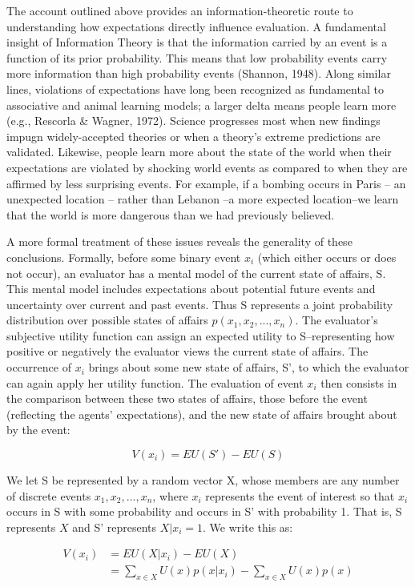\documentclass[]{article}
\begin{document}
The account outlined above provides an information-theoretic route to
understanding how expectations directly influence evaluation. A
fundamental insight of Information Theory is that the information
carried by an event is a function of its prior probability. This means
that low probability events carry more information than high probability
events (Shannon, 1948). Along similar lines, violations of expectations
have long been recognized as fundamental to associative and animal
learning models; a larger delta means people learn more (e.g., Rescorla
\& Wagner, 1972). Science progresses most when new findings impugn
widely-accepted theories or when a theory's extreme predictions are
validated. Likewise, people learn more about the state of the world when
their expectations are violated by shocking world events as compared to
when they are affirmed by less surprising events. For example, if a
bombing occurs in Paris -- an unexpected location -- rather than Lebanon
--a more expected location--we learn that the world is more dangerous
than we had previously believed.

A more formal treatment of these issues reveals the generality of these
conclusions. Formally, before some binary event \(x_i\) (which either
occurs or does not occur), an evaluator has a mental model of the
current state of affairs, S. This mental model includes expectations
about potential future events and uncertainty over current and past
events. Thus S represents a joint probability distribution over possible
states of affairs \(p(x_1, x_2, ..., x_n)\). The evaluator's subjective
utility function can assign an expected utility to S--representing how
positive or negatively the evaluator views the current state of affairs.
The occurrence of \(x_i\) brings about some new state of affairs, S', to
which the evaluator can again apply her utility function. The evaluation
of event \(x_i\) then consists in the comparison between these two
states of affairs, those before the event (reflecting the agents'
expectations), and the new state of affairs brought about by the event:

\[ V(x_i) = EU(S') -EU(S) \]

We let S be represented by a random vector X, whose members are any
number of discrete events \(x_1, x_2, ..., x_n\), where \(x_i\)
represents the event of interest so that \(x_i\) occurs in S with some
probability and occurs in S' with probability 1. That is, S represents
\(X\) and S' represents \(X|x_i=1\). We write this as:

\[
\begin{aligned}
V(x_i) &= EU(X|x_i) - EU(X) \\
&= \sum_{x \in X} U(x)p(x|x_i) - \sum_{x \in X} U(x)p(x)
\end{aligned}\]
\end{document}
